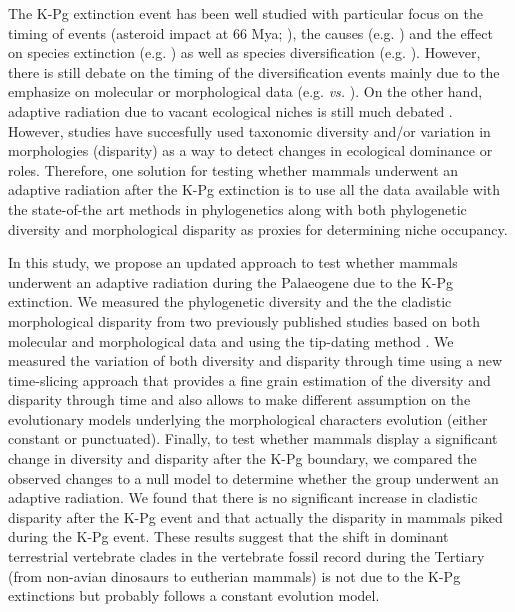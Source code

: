 \documentclass[12pt,letterpaper]{article}
\begin{document}
The K-Pg extinction event has been well studied with particular focus on the timing of events (asteroid impact at 66 Mya; \cite{rennetime2013}), the causes (e.g. \cite{rennetime2013,Brusatte2015}) and the effect on species extinction (e.g. \cite{Erwin1998344,Brusatte2015}) as well as species diversification (e.g. \cite{Stadler12042011,meredithimpacts2011,O'Leary08022013}). However, there is still debate on the timing of the diversification events mainly due to the emphasize on molecular or morphological data (e.g. \cite{meredithimpacts2011} \textit{vs.} \cite{O'Leary08022013}). On the other hand, adaptive radiation due to vacant ecological niches is still much debated \cite{OlsonRadiation,Losos2010,glor2010phylogenetic}. However, studies have succesfully used taxonomic diversity \cite{Stadler12042011,meredithimpacts2011,O'Leary08022013} and/or variation in morphologies (disparity) \cite{Wills1994,BIJ:BIJ455,Wesley-Hunt2005,brusatte50,cisneros2010,prentice2011,anderson2012using,Hughes20082013,bentonmodels2014} as a way to detect changes in ecological dominance or roles.
Therefore, one solution for testing whether mammals underwent an adaptive radiation after the K-Pg extinction is to use all the data available with the state-of-the art methods in phylogenetics along with both phylogenetic diversity and morphological disparity as proxies for determining niche occupancy.

In this study, we propose an updated approach to test whether mammals underwent an adaptive radiation during the Palaeogene due to the K-Pg extinction. We measured the phylogenetic diversity and the the cladistic morphological disparity from two previously published studies \cite{Slater2012MEE,beckancient2014} based on both molecular and morphological data and using the tip-dating method \cite{ronquista2012}. We measured the variation of both diversity and disparity through time using a new time-slicing approach that provides a fine grain estimation of the diversity and disparity through time and also allows to make different assumption on the evolutionary models underlying the morphological characters evolution (either constant or punctuated). Finally, to test whether mammals display a significant change in diversity and disparity after the K-Pg boundary, we compared the observed changes to a null model to determine whether the group underwent an adaptive radiation. We found that there is no significant increase in cladistic disparity after the K-Pg event and that actually the disparity in mammals piked during the K-Pg event. These results suggest that the shift in dominant terrestrial vertebrate clades in the vertebrate fossil record during the Tertiary (from non-avian dinosaurs to eutherian mammals) is not due to the K-Pg extinctions but probably follows a constant evolution model.
\end{document}
